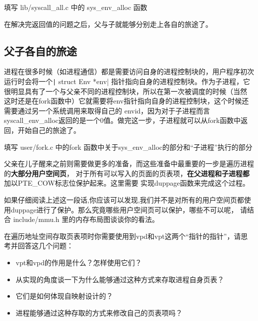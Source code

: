\begin{exercise}
填写 lib/syscall\_all.c 中的 sys\_env\_alloc 函数
\end{exercise}

在解决完返回值的问题之后，父与子就能够分别走上各自的旅途了。

\subsection{父子各自的旅途}

进程在很多时候（如进程通信）都是需要访问自身的进程控制块的，用户程序初次运行时会将一个\texttt| struct Env *env|
指针指向自身的进程控制块。作为子进程，它很明显具有了一个与父亲不同的进程控制块，所以在第一次被调度的时候（当然
这时还是在fork函数中）它就需要将env指针指向自身的进程控制块，这个时候还需要通过另一个系统调用来取得自己的
envid，因为对于子进程而言syscall\_env\_alloc返回的是一个0值。做完这一步，子进程就可以从fork函数中返回，开始自己的旅途了。

\begin{exercise}
 填写 user/fork.c 中的fork 函数中关于sys\_env\_alloc的部分和“子进程”执行的部分
\end{exercise}

父亲在儿子醒来之前则需要做更多的准备，而这些准备中最重要的一步是遍历进程的\textbf{大部分用户空间页}，
对于所有可以写入的页面的页表项，\textbf{在父进程和子进程都}加以PTE\_COW标志位保护起来。这里需要
实现duppage函数来完成这个过程。

\begin{thinking}\label{think:遍历页}
	如果仔细阅读上述这一段话,你应该可以发现,我们并不是对所有的用户空间页都使用duppage进行了保护。那么究竟哪些用户空间页可以保护，哪些不可以呢，
	请结合 include/mmu.h 里的内存布局图谈谈你的看法。
\end{thinking}

\begin{thinking}\label{think:vpt的使用}
在遍历地址空间存取页表项时你需要使用到vpd和vpt这两个“指针的指针”，请思考并回答这几个问题：
\begin{itemize}
 \item vpt和vpd的作用是什么？怎样使用它们？
 \item 从实现的角度谈一下为什么能够通过这种方式来存取进程自身页表？
 \item 它们是如何体现自映射设计的？
 \item 进程能够通过这种存取的方式来修改自己的页表项吗？
\end{itemize}
\end{thinking}

